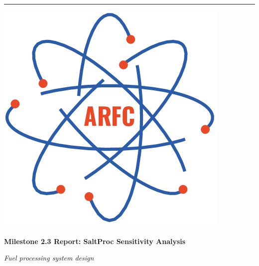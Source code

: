 \begin{titlepage} %
    \newcommand{\HRule}{\rule{\linewidth}{0.5mm}} %

    \center %

    \HRule
    \vspace{0.2cm}
     \begin{minipage}{0.4\textwidth}
        \includegraphics[width=\textwidth]{./arfc-logo.png}
        \end{minipage}%
        \begin{minipage}{0.6\textwidth}
        {\begin{flushright}\huge\bfseries Milestone 2.3 Report:
        SaltProc
        Sensitivity Analysis
                           \end{flushright}}
        {\begin{flushright}\large\textit{Fuel processing system
        design}\end{flushright}}
        \end{minipage}


\end{titlepage}
